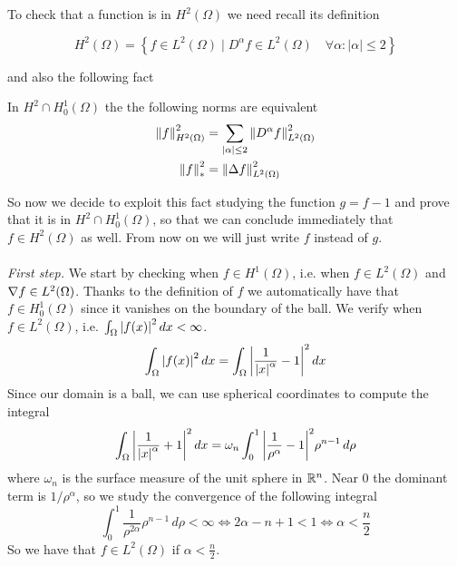 To check that a function is in \(H^2(\Omega)\) we need recall its definition
\begin{remark}
    \[H^2(\Omega) = \left\{ f \in L^2(\Omega) \mid D^\alpha f \in L^2(\Omega) \quad \forall \alpha : |\alpha|\leq 2\right\}\]
\end{remark}
and also the following fact
\begin{remark}
    In $H^2 \cap H^1_0 (\Omega)$ the the following norms are equivalent
    \begin{align*}
        \norm{f}_{H^2(\Omega)}^2 & = \sum_{|\alpha| \leq 2} \norm{D^\alpha f}_{L^2(\Omega)}^2 \\
        \norm{f}^2_{*}           & = \norm{\Delta f}_{L^2(\Omega)}^2
    \end{align*}
\end{remark}
So now we decide to exploit this fact studying the function $g=f-1$ and prove that it is in $H^2 \cap H^1_0(\Omega)$,
so that we can conclude immediately that \(f \in H^2(\Omega)\) as well.
From now on we will just write $f$ instead of $g$.\\
\vspace{0.1cm}\\
\textit{First step.}
We start by checking when \(f \in H^1(\Omega)\), i.e. when \(f \in L^2(\Omega)\) and \(\nabla f \in L^2(\Omega)\).
Thanks to the definition of \(f\) we automatically have that \(f \in H^1_0(\Omega)\) since it vanishes on the boundary of the ball.
We verify when \(f \in L^2(\Omega)\), i.e. \(\int_\Omega \abs{f(x)}^2 \, dx < \infty\).
\[
    \begin{split}
        \int_\Omega \abs{f(x)}^2 \, dx = \int_\Omega \abs{\frac{1}{\abs{x}^\alpha}-1}^2 \, dx
    \end{split}
\]
Since our domain is a ball, we can use spherical coordinates to compute the
integral
\begin{align*}
    \int_\Omega \abs{\frac{1}{\abs{x}^\alpha}+1}^2 \, dx = \omega_n \int_0^1 \abs{\frac{1}{\rho^\alpha}-1}^2  \rho^{n-1} \, d\rho
\end{align*}
where \(\omega_n\) is the surface measure of the unit sphere in \(\mathbb{R}^n\).
Near 0 the dominant term is $1/\rho^\alpha$, so we study the convergence of the following integral
\begin{equation*}
    \int_0^1 {\frac{1}{\rho^{2\alpha}} \rho^{n-1} \, d\rho < \infty \iff  2 \alpha - n + 1 < 1 \iff \alpha < \frac{n}{2}}
\end{equation*}
So we have that \(f \in L^2(\Omega)\) if \(\alpha < \frac{n}{2}\).\\
